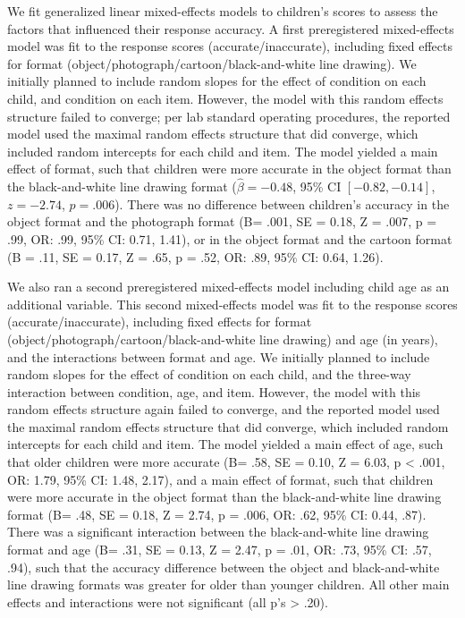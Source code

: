 \documentclass[10pt, letterpaper]{article}
\begin{document}
We fit generalized linear mixed-effects models to children's scores to
assess the factors that influenced their response accuracy. A first
preregistered mixed-effects model was fit to the response scores
(accurate/inaccurate), including fixed effects for format
(object/photograph/cartoon/black-and-white line drawing). We initially
planned to include random slopes for the effect of condition on each
child, and condition on each item. However, the model with this random
effects structure failed to converge; per lab standard operating
procedures, the reported model used the maximal random effects structure
that did converge, which included random intercepts for each child and
item. The model yielded a main effect of format, such that children were
more accurate in the object format than the black-and-white line drawing
format (\(\hat{\beta} = -0.48\), 95\% CI \([-0.82, -0.14]\),
\(z = -2.74\), \(p = .006\)). There was no difference between children's
accuracy in the object format and the photograph format (B= .001, SE =
0.18, Z = .007, p = .99, OR: .99, 95\% CI: 0.71, 1.41), or in the object
format and the cartoon format (B = .11, SE = 0.17, Z = .65, p = .52, OR:
.89, 95\% CI: 0.64, 1.26).

We also ran a second preregistered mixed-effects model including child
age as an additional variable. This second mixed-effects model was fit
to the response scores (accurate/inaccurate), including fixed effects
for format (object/photograph/cartoon/black-and-white line drawing) and
age (in years), and the interactions between format and age. We
initially planned to include random slopes for the effect of condition
on each child, and the three-way interaction between condition, age, and
item. However, the model with this random effects structure again failed
to converge, and the reported model used the maximal random effects
structure that did converge, which included random intercepts for each
child and item. The model yielded a main effect of age, such that older
children were more accurate (B= .58, SE = 0.10, Z = 6.03, p \textless{}
.001, OR: 1.79, 95\% CI: 1.48, 2.17), and a main effect of format, such
that children were more accurate in the object format than the
black-and-white line drawing format (B= .48, SE = 0.18, Z = 2.74, p =
.006, OR: .62, 95\% CI: 0.44, .87). There was a significant interaction
between the black-and-white line drawing format and age (B= .31, SE =
0.13, Z = 2.47, p = .01, OR: .73, 95\% CI: .57, .94), such that the
accuracy difference between the object and black-and-white line drawing
formats was greater for older than younger children. All other main
effects and interactions were not significant (all p's \textgreater{}
.20).
\end{document}

